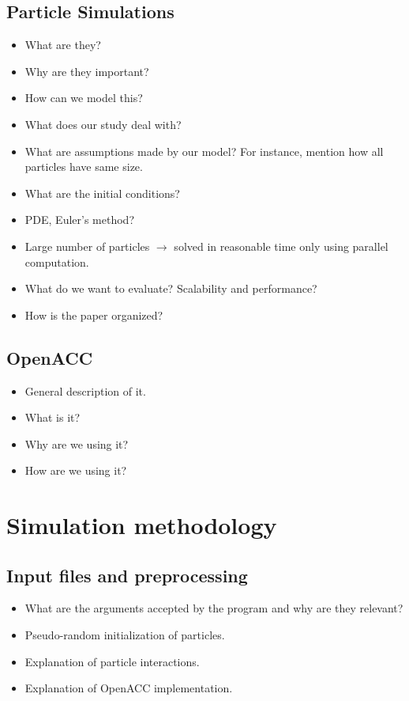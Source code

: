 \documentclass{usiinftr}
\begin{document}
\subsection{Particle Simulations}
%
\begin{itemize}
	\item What are they?
	\item Why are they important?
	\item How can we model this?
	\item What does our study deal with?
	\item What are assumptions made by our model? For instance, mention how all particles have same size.
	\item What are the initial conditions?
	\item PDE, Euler's method?
	\item Large number of particles $\to$ solved in reasonable time only using parallel computation.
	\item What do we want to evaluate? Scalability and performance?
	\item How is the paper organized?
\end{itemize}
%

\subsection{OpenACC}


%
\begin{itemize}
	\item General description of it.
	\item What is it?
	\item Why are we using it?
	\item How are we using it?
\end{itemize}
%


\section{Simulation methodology}
\subsection{Input files and preprocessing}
%
\begin{itemize}
	\item What are the arguments accepted by the program and why are they relevant?
	\item Pseudo-random initialization of particles.
	\item Explanation of particle interactions.
	\item Explanation of OpenACC implementation.
\end{itemize}
%
\end{document}
